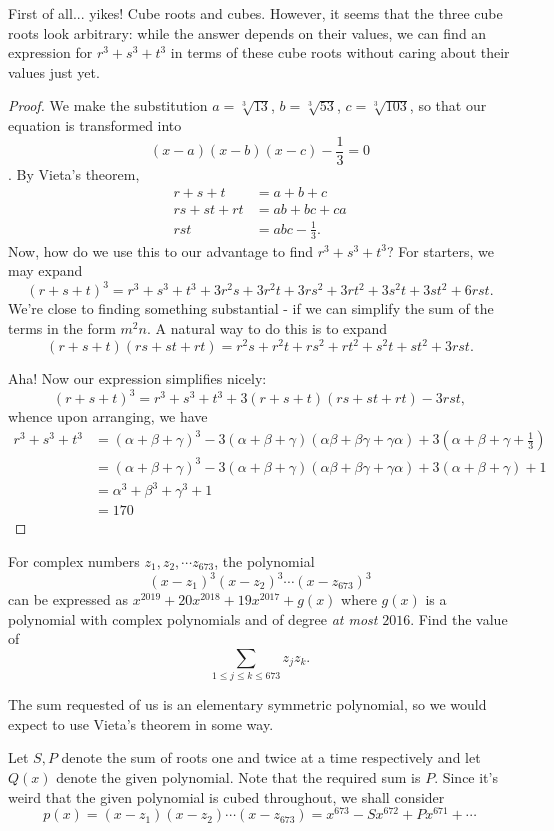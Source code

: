 \documentclass[../main.tex]{subfiles}
\begin{document}
First of all... yikes! Cube roots and cubes. However, it seems that the three cube roots look arbitrary: while the answer depends on their values, we can find an expression for $r^3+s^3+t^3$ in terms of these cube roots without caring about their values just yet. 
\begin{proof}
    We make the substitution $a=\sqrt[3]{13}$, $b=\sqrt[3]{53}$, $c=\sqrt[3]{103}$, so that our equation is transformed into $$(x-a)(x-b)(x-c)-\frac{1}{3}=0$$. By Vieta's theorem, 
\begin{align*}
    r+s+t&=a+b+c \\
    rs+st+rt&=ab+bc+ca \\
    rst&=abc-\frac{1}{3}.
\end{align*}
Now, how do we use this to our advantage to find $r^3+s^3+t^3$? For starters, we may expand
$$(r+s+t)^3=r^3+s^3+t^3+3r^2s+3r^2t+3rs^2+3rt^2+3s^2t+3st^2+6rst.$$
We're close to finding something substantial - if we can simplify the sum of the terms in the form $m^2n$. A natural way to do this is to expand
$$(r+s+t)(rs+st+rt)=r^2s+r^2t+rs^2+rt^2+s^2t+st^2+3rst.$$

Aha! Now our expression simplifies nicely:
$$(r+s+t)^3=r^3+s^3+t^3+3(r+s+t)(rs+st+rt)-3rst,$$
whence upon arranging, we have
\begin{align*}
    r^3+s^3+t^3
    &=(\alpha+\beta+\gamma)^3-3(\alpha+\beta+\gamma)(\alpha\beta+\beta\gamma+\gamma\alpha)+3(\alpha+\beta+\gamma+\frac{1}{3})\\
    &=(\alpha+\beta+\gamma)^3-3(\alpha+\beta+\gamma)(\alpha\beta+\beta\gamma+\gamma\alpha)+3(\alpha+\beta+\gamma)+1 \\
    &=\alpha^3+\beta^3+\gamma^3+1 \\
    &=\boxed{170}
\end{align*}
\end{proof}

\begin{example}[2019 AIME I P10]
For complex numbers $z_1, z_2,\cdots z_{673}$, the polynomial
$$(x-z_1)^3(x-z_2)^3\cdots(x-z_673)^3$$
can be expressed as $x^{2019}+20x^{2018}+19x^{2017}+g(x)$ where $g(x)$ is a polynomial with complex polynomials and of degree \textit{at most} $2016$. Find the value of 
$$\sum_{1\leq j\leq k\leq 673}z_jz_k.$$
\end{example}
The sum requested of us is an elementary symmetric polynomial, so we would expect to use Vieta's theorem in some way.

Let $S, P$ denote the sum of roots one and twice at a time respectively and let $Q(x)$ denote the given polynomial. Note that the required sum is $P$. Since it's weird that the given polynomial is cubed throughout, we shall consider
$$p(x)=(x-z_1)(x-z_2)\cdots(x-z_{673})=x^{673}-Sx^{672}+Px^{671}+\cdots$$
\end{document}
